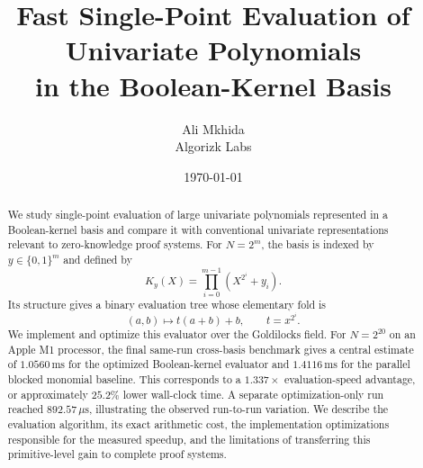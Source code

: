 \documentclass[11pt]{article}
\title{Fast Single-Point Evaluation of Univariate Polynomials\\
in the Boolean-Kernel Basis}
\author{Ali Mkhida\\
Algorizk Labs}
\date{\today}
\begin{document}
\maketitle

\begin{abstract}
We study single-point evaluation of large univariate polynomials represented
in a Boolean-kernel basis and compare it with conventional univariate
representations relevant to zero-knowledge proof systems. For
\(N=2^m\), the basis is indexed by \(y\in\{0,1\}^m\) and defined by
\[
K_y(X)=\prod_{i=0}^{m-1}\left(X^{2^i}+y_i\right).
\]
Its structure gives a binary evaluation tree whose elementary fold is
\[
(a,b)\longmapsto t(a+b)+b,
\qquad t=x^{2^i}.
\]
We implement and optimize this evaluator over the Goldilocks field.
For \(N=2^{20}\) on an Apple M1 processor, the final same-run
cross-basis benchmark gives a central estimate of \(1.0560\,\mathrm{ms}\)
for the optimized Boolean-kernel evaluator and \(1.4116\,\mathrm{ms}\)
for the parallel blocked monomial baseline.  This corresponds to a
\(1.337\times\) evaluation-speed advantage, or approximately \(25.2\%\)
lower wall-clock time.  A separate optimization-only run reached
\(892.57\,\mu\mathrm{s}\), illustrating the observed run-to-run variation. We describe the evaluation algorithm, its exact
arithmetic cost, the implementation optimizations responsible for the
measured speedup, and the limitations of transferring this primitive-level
gain to complete proof systems.
\end{abstract}












\end{document}
